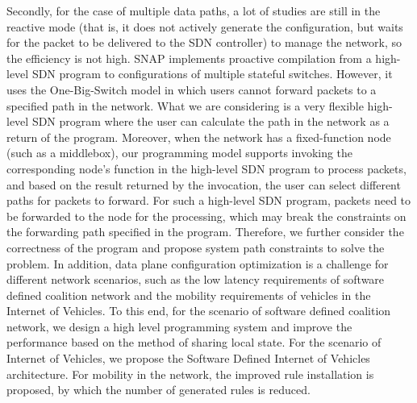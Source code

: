 \documentclass{ctexart}
\begin{document}
Secondly, for the case of multiple data paths, a lot of studies are still in the reactive mode (that is, it does not actively generate the configuration, but waits for the packet to be delivered to the SDN controller) to manage the network, so the efficiency is not high. SNAP implements proactive compilation from a high-level SDN program to configurations of multiple stateful switches. However, it uses the One-Big-Switch model in which users cannot forward packets to a specified path in the network. What we are considering is a very flexible high-level SDN program where the user can calculate the path in the network as a return of the program. Moreover, when the network has a fixed-function node (such as a middlebox), our programming model supports invoking the corresponding node's function in the high-level SDN program to process packets, and based on the result returned by the invocation, the user can select different paths for packets to forward. For such a high-level SDN program, packets need to be forwarded to the node for the processing, which may break the constraints on the forwarding path specified in the program. Therefore, we further consider the correctness of the program and propose system path constraints to solve the problem. In addition, data plane configuration optimization is a challenge for different network scenarios, such as the low latency requirements of software defined coalition network and the mobility requirements of vehicles in the Internet of Vehicles. To this end, for the scenario of software defined coalition network, we design a high level programming system and improve the performance based on the method of sharing local state. For the scenario of Internet of Vehicles, we propose the Software Defined Internet of Vehicles architecture. For mobility in the network, the improved rule installation is proposed, by which the number of generated rules is reduced.
\end{document}
